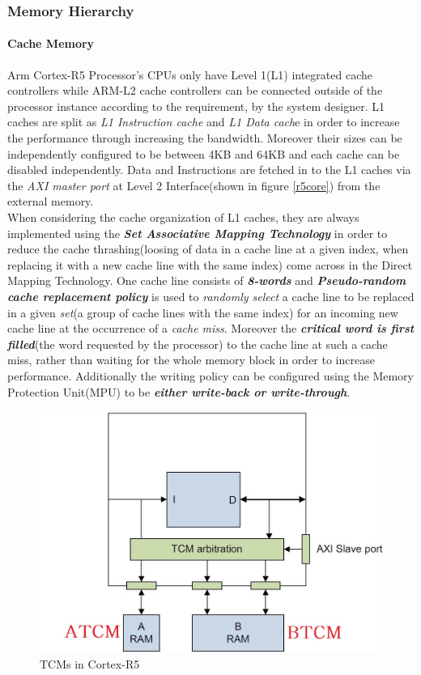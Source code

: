\documentclass[a4paper,11pt]{article}
\begin{document}
\subsubsection{Memory Hierarchy}

\paragraph{Cache Memory} Arm Cortex-R5 Processor's CPUs only have Level 1(L1) integrated cache controllers while ARM-L2 cache controllers can be connected outside of the processor instance according to the requirement, by the system designer. L1 caches are split as \textit{L1 Instruction cache} and \textit{L1 Data cach}e in order to increase the performance through increasing the bandwidth. Moreover their sizes can be independently configured to be between 4KB and 64KB and each cache can be disabled independently. Data and Instructions are fetched in to the L1 caches via the \textit{AXI master port} at Level 2 Interface(shown in figure \ref{r5core}) from the external memory.\\

 When considering the cache organization of L1 caches, they are always implemented using the \textit{\textbf{Set Associative Mapping Technology}} in order to reduce the cache thrashing(loosing of data in a cache line at a given index, when replacing it with a new cache line with the same index) come across in the Direct Mapping Technology. One cache line consists of \textit{\textbf{8-words}} and \textit{\textbf{Pseudo-random cache replacement policy}}  is used to \textit{randomly select} a cache line to be replaced in a given \textit{set}(a group of cache lines with the same index) for an incoming new cache line at the occurrence of a \textit{cache miss}. Moreover the \textbf{\textit{critical word is first filled}}(the word requested by the processor) to the cache line at such a cache miss, rather than waiting for the whole memory block in order to increase performance. Additionally the writing policy can be configured using the Memory Protection Unit(MPU) to be \textbf{\textit{either write-back or write-through}}.


\begin{figure}
	\includegraphics[scale= 0.4]{figures/tcm}
	\caption{TCMs in Cortex-R5} \label{tcm}
\end{figure}
\end{document}
